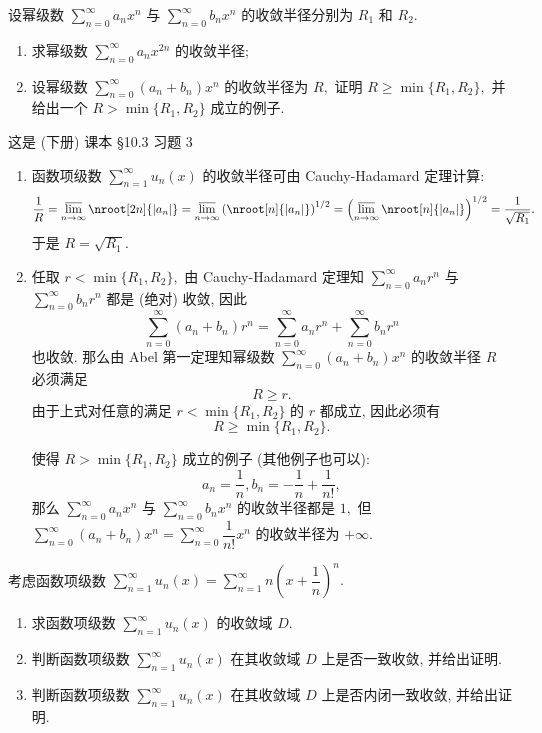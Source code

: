 \begin{question}[points = 10]
设幂级数 $\sum\limits_{n=0}^\infty a_n x^n$ 与 $\sum\limits_{n=0}^\infty b_n x^n$ 的收敛半径分别为 $R_1$ 和 $R_2.$
\begin{enumerate}
\item 求幂级数 $\sum\limits_{n=0}^\infty a_n x^{2n}$ 的收敛半径;
\item 设幂级数 $\sum\limits_{n=0}^\infty (a_n + b_n) x^n$ 的收敛半径为 $R,$ 证明 $R \geqslant \min\{R_1, R_2\},$ 并给出一个 $R > \min\{R_1, R_2\}$ 成立的例子.
\end{enumerate}

\end{question}

\begin{solution}
这是 (下册) 课本 \S 10.3 习题 3

\begin{enumerate}
\item 函数项级数 $\sum\limits_{n=1}^{\infty} u_n(x)$ 的收敛半径可由 Cauchy-Hadamard 定理计算:
$$\dfrac{1}{R} = \varlimsup_{n\to\infty} \nroot[2n]{\lvert a_{n} \rvert} = \varlimsup_{n\to\infty} \left( \nroot[n]{\lvert a_{n} \rvert} \right)^{1/2} = \left( \varlimsup_{n\to\infty} \nroot[n]{\lvert a_{n} \rvert} \right)^{1/2} = \dfrac{1}{\sqrt{R_1}}.$$
于是 $R = \sqrt{R_1}.$
\item 任取 $r < \min\{R_1, R_2\},$ 由 Cauchy-Hadamard 定理知 $\sum\limits_{n=0}^\infty a_n r^n$ 与 $\sum\limits_{n=0}^\infty b_n r^n$ 都是 (绝对) 收敛, 因此
$$\sum\limits_{n=0}^\infty (a_n + b_n) r^n = \sum\limits_{n=0}^\infty a_n r^n + \sum\limits_{n=0}^\infty b_n r^n$$
也收敛. 那么由 Abel 第一定理知幂级数 $\sum\limits_{n=0}^\infty (a_n + b_n) x^n$ 的收敛半径 $R$ 必须满足
$$R \geqslant r.$$
由于上式对任意的满足 $r < \min\{R_1, R_2\}$ 的 $r$ 都成立, 因此必须有 $$R \geqslant \min\{R_1, R_2\}.$$

使得 $R > \min\{R_1, R_2\}$ 成立的例子 (其他例子也可以):
$$a_n = \dfrac{1}{n}, b_n = -\dfrac{1}{n} + \dfrac{1}{n!},$$
那么 $\sum\limits_{n=0}^\infty a_n x^n$ 与 $\sum\limits_{n=0}^\infty b_n x^n$ 的收敛半径都是 $1,$ 但 $\sum\limits_{n=0}^\infty (a_n + b_n) x^n = \sum\limits_{n=0}^\infty \dfrac{1}{n!} x^n$ 的收敛半径为 $+\infty.$
\end{enumerate}
\end{solution}

\begin{question}[points = 10]
考虑函数项级数 $\sum\limits_{n=1}^{\infty} u_n(x) = \sum\limits_{n=1}^{\infty} n \left( x + \dfrac{1}{n} \right)^n.$
\begin{enumerate}
\item 求函数项级数 $\sum\limits_{n=1}^{\infty} u_n(x)$ 的收敛域 $D.$
\item 判断函数项级数 $\sum\limits_{n=1}^{\infty} u_n(x)$ 在其收敛域 $D$ 上是否一致收敛, 并给出证明.
\item 判断函数项级数 $\sum\limits_{n=1}^{\infty} u_n(x)$ 在其收敛域 $D$ 上是否内闭一致收敛, 并给出证明.
\end{enumerate}

\end{question}

